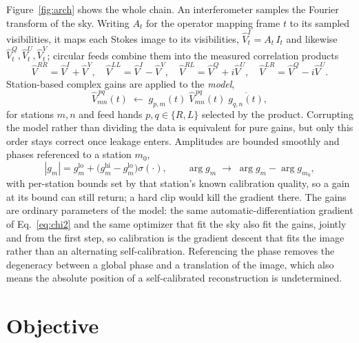 \documentclass[11pt]{article}
\begin{document}
Figure~\ref{fig:arch} shows the whole chain. An interferometer samples the
Fourier transform of the sky. Writing $A_t$ for the operator mapping frame $t$ to
its sampled visibilities, it maps each Stokes image to its visibilities,
$\hat V^{I}_t=A_t\,I_t$ and likewise $\hat V^{Q}_t,\hat V^{U}_t,\hat V^{V}_t$;
circular feeds combine them into the measured correlation products
\begin{equation}
  \hat V^{RR}=\hat V^{I}+\hat V^{V},\quad
  \hat V^{LL}=\hat V^{I}-\hat V^{V},\quad
  \hat V^{RL}=\hat V^{Q}+i\hat V^{U},\quad
  \hat V^{LR}=\hat V^{Q}-i\hat V^{U}.
  \label{eq:products}
\end{equation}
Station-based complex gains are applied to the \emph{model},
\begin{equation}
  \hat V^{\,pq}_{mn}(t)\;\longleftarrow\;
  g_{p,m}(t)\;\hat V^{\,pq}_{mn}(t)\;\overline{g_{q,n}(t)},
  \label{eq:rime}
\end{equation}
for stations $m,n$ and feed hands $p,q\in\{R,L\}$ selected by the product.
Corrupting the model rather than dividing the data is equivalent for pure gains,
but only this order stays correct once leakage enters. Amplitudes are bounded
smoothly and phases referenced to a station $m_0$,
\begin{equation}
  |g_m| = g^{\mathrm{lo}}_m+\bigl(g^{\mathrm{hi}}_m-g^{\mathrm{lo}}_m\bigr)\sigma(\cdot),
  \qquad
  \arg g_m \;\to\; \arg g_m-\arg g_{m_0},
  \label{eq:gains}
\end{equation}
with per-station bounds set by that station's known calibration quality, so a gain
at its bound can still return; a hard clip would kill the gradient there. The
gains are ordinary parameters of the model: the same automatic-differentiation
gradient of Eq.~\eqref{eq:chi2} and the same optimizer that fit the sky also fit
the gains, jointly and from the first step, so calibration is the gradient descent
that fits the image rather than an alternating self-calibration.
Referencing the phase removes the degeneracy between a global phase and a
translation of the image, which also means the absolute position of a
self-calibrated reconstruction is undetermined.

\section{Objective}
\end{document}
